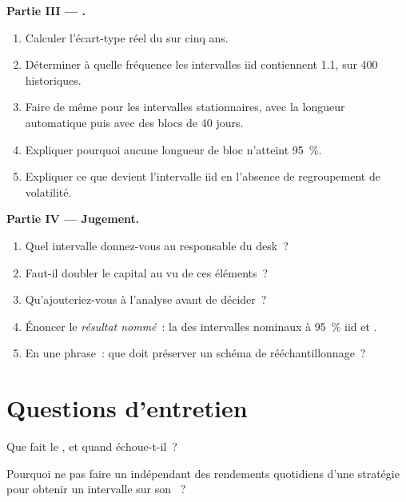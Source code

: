 \begin{problem}
\medskip\noindent\textbf{Partie III --- .}
\begin{enumerate}[resume]
\item Calculer l'écart-type réel du  sur cinq ans.
\item Déterminer à quelle fréquence les intervalles iid contiennent 1.1, sur 400 historiques.
\item Faire de même pour les intervalles stationnaires, avec la longueur automatique puis avec des blocs de 40 jours.
\item Expliquer pourquoi aucune longueur de bloc n'atteint 95~\%.
\item Expliquer ce que devient l'intervalle iid en l'absence de regroupement de volatilité.
\end{enumerate}

\medskip\noindent\textbf{Partie IV --- Jugement.}
\begin{enumerate}[resume]
\item Quel intervalle donnez-vous au responsable du desk~?
\item Faut-il doubler le capital au vu de ces éléments~?
\item Qu'ajouteriez-vous à l'analyse avant de décider~?
\item Énoncer le \emph{résultat nommé}~: la  des intervalles nominaux à 95~\% iid et .
\item En une phrase~: que doit préserver un schéma de rééchantillonnage~?
\end{enumerate}
\end{problem}

\section{Questions d'entretien}

\begin{interviewq}\label{iq:qm:resampling:1}
Que fait le , et quand échoue-t-il~?
\end{interviewq}

\begin{interviewq}\label{iq:qm:resampling:2}
Pourquoi ne pas faire un  indépendant des rendements quotidiens d'une stratégie pour obtenir un intervalle sur son ~?
\end{interviewq}

